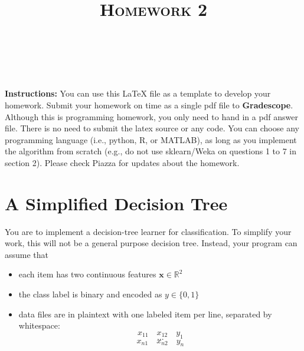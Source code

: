 \documentclass[letter]{article}
\title{\textsc{Homework 2}} %
\author{
\red{$>>$NAME HERE$<<$} \\
\red{$>>$ID HERE$<<$}\\
}
\date{}
\theoremstyle{definition}
\newcommand{\RR}{\mathbb{R}}
\def\x{\mathbf x}
\begin{document}
\maketitle 


\textbf{Instructions:} 
You can use this LaTeX file as a template to develop your homework. Submit your homework on time as a single pdf file to {\bf Gradescope}. Although this is programming homework, you only need to hand in a pdf answer file. There is no need to submit the latex source or any code. You can choose any programming language (i.e., python, R, or MATLAB), as long as you implement the algorithm from scratch (e.g., do not use sklearn/Weka on questions 1 to 7 in section 2). Please check Piazza for updates about the homework.

\section{A Simplified Decision Tree}
You are to implement a decision-tree learner for classification.
To simplify your work, this will not be a general purpose decision tree.  Instead, your program can assume that
\begin{itemize}
\item each item has two continuous features $\x \in \RR^2$
\item the class label is binary and encoded as $y \in \{0,1\}$
\item data files are in plaintext with one labeled item per line, separated by whitespace:
$$x_{11} \quad x_{12} \quad y_1$$
$$...$$
$$x_{n1} \quad x_{n2} \quad y_n$$
\end{itemize}
\end{document}
